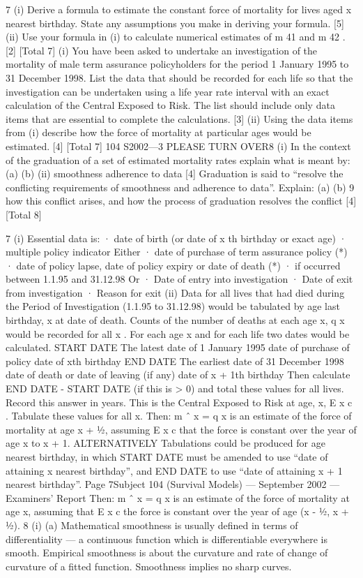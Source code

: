 \documentclass[a4paper,12pt]{article}
\begin{document}
\begin{enumerate}
7
(i) Derive a formula to estimate the constant force of mortality for lives aged x
nearest birthday. State any assumptions you make in deriving your formula.
[5]
(ii) Use your formula in (i) to calculate numerical estimates of m 41 and m 42 .
[2]
[Total 7]
(i) You have been asked to undertake an investigation of the mortality of male
term assurance policyholders for the period 1 January 1995 to 31 December
1998. List the data that should be recorded for each life so that the
investigation can be undertaken using a life year rate interval with an exact
calculation of the Central Exposed to Risk. The list should include only data
items that are essential to complete the calculations.
[3]
(ii) Using the data items from (i) describe how the force of mortality at particular
ages would be estimated.
[4]
[Total 7]
104 S2002—3
PLEASE TURN OVER8
(i)
In the context of the graduation of a set of estimated mortality rates explain
what is meant by:
(a)
(b)
(ii)
smoothness
adherence to data
[4]
Graduation is said to “resolve the conflicting requirements of smoothness and
adherence to data”.
Explain:
(a)
(b)
9
how this conflict arises, and
how the process of graduation resolves the conflict
[4]
[Total 8]

7
(i) Essential data is:
· date of birth (or date of x th birthday or exact age)
· multiple policy indicator
Either
· date of purchase of term assurance policy (*)
· date of policy lapse, date of policy expiry or date of death (*)
· if occurred between 1.1.95 and 31.12.98
Or
· Date of entry into investigation
· Date of exit from investigation
· Reason for exit
(ii) Data for all lives that had died during the Period of Investigation (1.1.95 to
31.12.98) would be tabulated by age last birthday, x at date of death. Counts
of the number of deaths at each age x, q x would be recorded for all x .
For each age x and for each life two dates would be calculated.
START DATE
The latest date of
1 January 1995
date of purchase of policy
date of xth birthday
END DATE
The earliest date of
31 December 1998
date of death or date of leaving (if any)
date of x + 1th birthday
Then calculate END DATE - START DATE (if this is > 0) and total these
values for all lives. Record this answer in years. This is the Central Exposed
to Risk at age, x, E x c .
Tabulate these values for all x.
Then: m ˆ x =
q x
is an estimate of the force of mortality at age x + 1⁄2, assuming
E x c
that the force is constant over the year of age x to x + 1.
ALTERNATIVELY
Tabulations could be produced for age nearest birthday, in which
START DATE must be amended to use “date of attaining x nearest birthday”,
and END DATE to use “date of attaining x + 1 nearest birthday”.
Page 7Subject 104 (Survival Models) — September 2002 — Examiners’ Report
Then: m ˆ x =
q x
is an estimate of the force of mortality at age x, assuming that
E x c
the force is constant over the year of age (x - 1⁄2, x + 1⁄2).
8
(i)
(a)
Mathematical smoothness is usually defined in terms of differentiality — a continuous function which is differentiable everywhere is smooth.
Empirical smoothness is about the curvature and rate of change of curvature of a fitted function.
Smoothness implies no sharp curves.


\end{enumerate}
\end{document}
